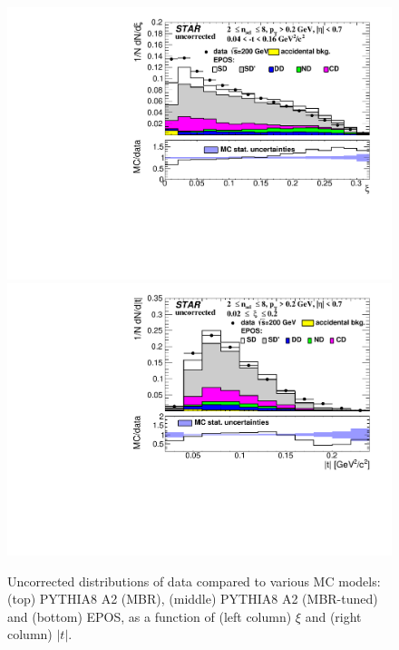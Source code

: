 \begin{figure}[h!]
	\includegraphics[width=.49\textwidth,page=1]{chapters/chrgSTAR/img/nonSD/SDT_epos_xi0_RP_starsim_xi.pdf}
	\hfill
	\includegraphics[width=.49\textwidth,page=1]{chapters/chrgSTAR/img/nonSD/SDT_epos_xi0_RP_starsim_t.pdf}
	\caption{Uncorrected distributions of data compared to various MC models: (top) PYTHIA8 A2 (MBR), (middle) PYTHIA8 A2 (MBR-tuned) and (bottom) EPOS, as a function of (left column) $\xi$  and (right column) $|t|$.}
	\label{fig:nonSDxit}
	\vspace{-1.5cm}
\end{figure}

